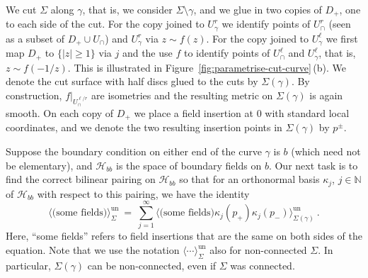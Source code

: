 \documentclass[11pt,a4paper]{article}
\numberwithin{equation}{section}
\begin{document}
We cut $\Sigma$ along $\gamma$, that is, we consider $\Sigma \setminus \gamma$, and we glue in two copies of $D_+$, one to each side of the cut. For the copy joined to $U_\gamma^r$ we identify points of $U_\cap^r$ (seen as a subset of $D_+ \cup U_\cap$) and $U_\gamma^r$ via $z \sim f(z)$. 
For the copy joined to $U_\gamma^\ell$ we first map $D_+$ to $\{ |z| \ge 1 \}$ via $j$ and the use $f$ to identify points of $U_\cap^\ell$ and $U_\gamma^\ell$, that is, $z \sim f(-1/z)$. This is illustrated in Figure~\ref{fig:parametrise-cut-curve}\,(b). We denote the cut surface with half discs glued to the cuts by $\Sigma(\gamma)$. By construction, $f|_{U_\cap^{\ell/r}}$ are isometries and the resulting metric on $\Sigma(\gamma)$ is again smooth.
On each copy of $D_+$ we place a field insertion at $0$ with standard local coordinates, and we denote the two resulting insertion points in $\Sigma(\gamma)$ by $p^\pm$.

\medskip

Suppose the boundary condition on either end of the curve $\gamma$ is $b$ (which need not be elementary), and $\mathcal{H}_{bb}$ is the space of boundary fields on $b$. Our next task is to find the correct bilinear pairing on $\mathcal{H}_{bb}$ so that for an orthonormal basis $\kappa_j$, $j \in \mathbb{N}$ of $\mathcal{H}_{bb}$ with respect to this pairing, we have the identity
\begin{equation}\label{eq:sum-intermediate}
\big\langle \text{(some fields)} \big\rangle^\mathrm{un}_\Sigma
~=~
\sum_{j=1}^\infty
\big\langle \text{(some fields)} \kappa_j(p_+) \kappa_j(p_-) \big\rangle^\mathrm{un}_{\Sigma(\gamma)}~.
\end{equation}
Here, ``some fields'' refers to field insertions  that are the same on both sides of the equation. 
Note that we use the notation $\langle \cdots \rangle^\mathrm{un}_{\Sigma}$ also for non-connected $\Sigma$. In particular, $\Sigma(\gamma)$ can be non-connected, even if $\Sigma$ was connected. 
\end{document}
